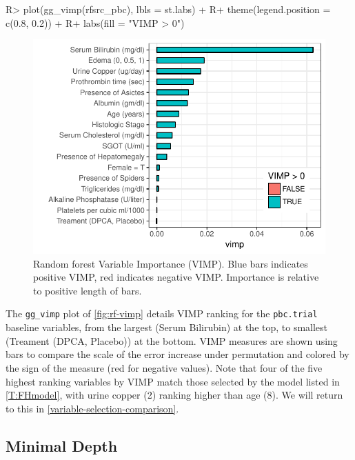 \documentclass[article]{jss}
\begin{document}
\begin{Schunk}
\begin{Sinput}
R> plot(gg_vimp(rfsrc_pbc), lbls = st.labs) +
R+   theme(legend.position = c(0.8, 0.2)) +
R+   labs(fill = "VIMP > 0")
\end{Sinput}
\begin{figure}[!htb]

{\centering \includegraphics{rfs-rf-vimp-1} 

}

\caption[Random forest Variable Importance (VIMP)]{Random forest Variable Importance (VIMP). Blue bars indicates positive VIMP, red indicates negative VIMP. Importance is relative to positive length of bars.}\label{fig:rf-vimp}
\end{figure}
\end{Schunk}

The \texttt{gg\_vimp} plot of \autoref{fig:rf-vimp} details VIMP ranking
for the \texttt{pbc.trial} baseline variables, from the largest (Serum
Bilirubin) at the top, to smallest (Treament (DPCA, Placebo)) at the
bottom. VIMP measures are shown using bars to compare the scale of the
error increase under permutation and colored by the sign of the measure
(red for negative values). Note that four of the five highest ranking
variables by VIMP match those selected by the\citep{fleming:1991} model
listed in \autoref{T:FHmodel}, with urine copper (2) ranking higher than
age (8). We will return to this in
\autoref{variable-selection-comparison}.

\subsection{Minimal Depth}\label{minimal-depth}
\end{document}
